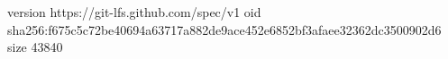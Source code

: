 version https://git-lfs.github.com/spec/v1
oid sha256:f675c5c72be40694a63717a882de9ace452e6852bf3afaee32362dc3500902d6
size 43840
